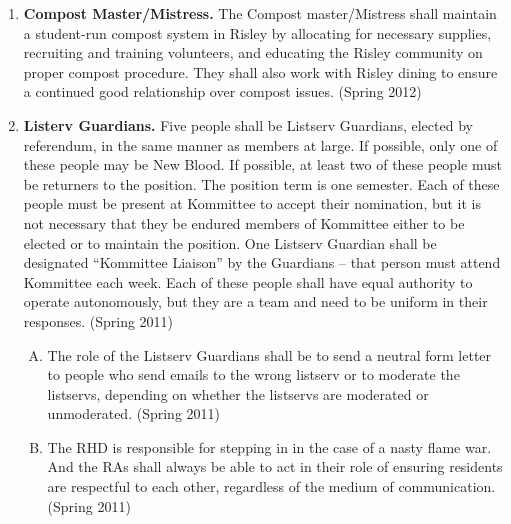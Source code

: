 \documentclass[12pt]{article}
\begin{document}
\begin{enumerate}[1.]
\item \textbf{Compost Master/Mistress.} The Compost master/Mistress shall maintain a student-run compost system in Risley by allocating for necessary supplies, recruiting and training volunteers, and educating the Risley community on proper compost procedure. They shall also work with Risley dining to ensure a continued good relationship over compost issues. (Spring 2012)
\item \textbf{Listerv Guardians.} Five people shall be Listserv Guardians, elected by referendum, in the same manner as members at large. If possible, only one of these people may be New Blood. If possible, at least two of these people must be returners to the position. The position term is one semester. Each of these people must be present at Kommittee to accept their nomination, but it is not necessary that they be endured members of Kommittee either to be elected or to maintain the position. One Listserv Guardian shall be designated “Kommittee Liaison” by the Guardians – that person must attend Kommittee each week. Each of these people shall have equal authority to operate autonomously, but they are a team and need to be uniform in their responses. (Spring 2011)
\begin{enumerate}[A.]
\item The role of the Listserv Guardians shall be to send a neutral form letter to people who send emails to the wrong listserv or to moderate the listservs, depending on whether the listservs are moderated or unmoderated. (Spring 2011) 
\item The RHD is responsible for stepping in in the case of a nasty flame war. And the RAs shall always be able to act in their role of ensuring residents are respectful to each other, regardless of the medium of communication. (Spring 2011)
\end{enumerate}
\end{enumerate}
\end{document}
